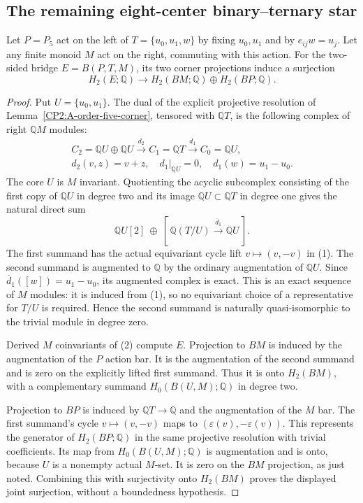 \subsection{The remaining eight-center binary--ternary star}

\begin{lemma}
\label{CP2:A-ternary-P5-fixed-core-bridge-surjection}
Let $P=P_5$ act on the left of
$T=\{u_0,u_1,w\}$ by fixing $u_0,u_1$ and by
$e_{ij}w=u_j$. Let any finite monoid $M$ act on the right,
commuting with this action. For the two-sided bridge
$E=B(P,T,M)$, its two corner projections induce a surjection
\[
 H_2(E;\mathbb Q)\longrightarrow
       H_2(BM;\mathbb Q)\oplus H_2(BP;\mathbb Q).
\]
\end{lemma}
\begin{proof}
Put $U=\{u_0,u_1\}$. The dual of the explicit projective
resolution of Lemma~\ref{CP2:A-order-five-corner}, tensored
with $\mathbb QT$, is the following complex of right
$\mathbb QM$ modules:
\[
 \begin{gathered}
 C_2=\mathbb QU\oplus\mathbb QU
   \xrightarrow{\ d_2\ }C_1=\mathbb QT
   \xrightarrow{\ d_1\ }C_0=\mathbb QU,\\
 d_2(v,z)=v+z,\quad
 d_1|_{\mathbb QU}=0,\quad d_1(w)=u_1-u_0.
 \end{gathered}                                         \tag{1}
\]
The core $U$ is $M$ invariant. Quotienting the acyclic
subcomplex consisting of the first copy of $\mathbb QU$
in degree two and its image $\mathbb QU\subset\mathbb QT$
in degree one gives the natural direct sum
\[
 \mathbb QU[2]\ \oplus\
 [\,\mathbb Q(T/U)\xrightarrow{\overline d_1}\mathbb QU\,].
                                                               \tag{2}
\]
The first summand has the actual equivariant cycle lift
$v\mapsto(v,-v)$ in (1). The second summand is augmented
to $\mathbb Q$ by the ordinary augmentation of $\mathbb QU$.
Since $\overline d_1([w])=u_1-u_0$, its augmented complex
is exact. This is an exact sequence of $M$ modules: it is
induced from (1), so no equivariant choice of a representative
for $T/U$ is required. Hence the second summand is naturally
quasi-isomorphic to the trivial module in degree zero.

Derived $M$ coinvariants of (2) compute $E$. Projection to
$BM$ is induced by the augmentation of the $P$ action bar.
It is the augmentation of the second summand and is zero
on the explicitly lifted first summand. Thus it is onto
$H_2(BM)$, with a complementary summand
$H_0(B(U,M);\mathbb Q)$ in degree two.

Projection to $BP$ is induced by $\mathbb QT\to\mathbb Q$
and the augmentation of the $M$ bar. The first summand's
cycle $v\mapsto(v,-v)$ maps to
$(\varepsilon(v),-\varepsilon(v))$. This represents the
generator of $H_2(BP;\mathbb Q)$ in the same projective
resolution with trivial coefficients. Its map from
$H_0(B(U,M);\mathbb Q)$ is augmentation and is onto,
because $U$ is a nonempty actual $M$-set. It is zero on
the $BM$ projection, as just noted. Combining this with
surjectivity onto $H_2(BM)$ proves the displayed joint
surjection, without a boundedness hypothesis.
\end{proof}

